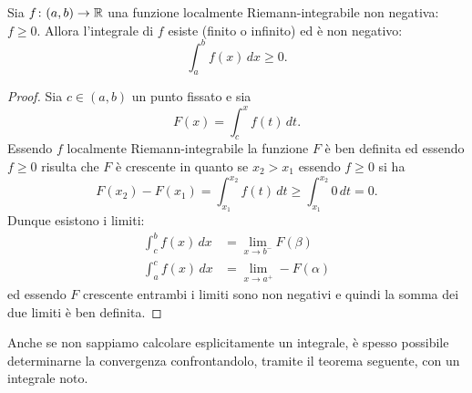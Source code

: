 \begin{theorem}
\label{th:integrabilita_positive}
\mymark{**}
Sia $f\colon (a,b)\to \mathbb R$ una funzione localmente Riemann-integrabile
non negativa: $f\ge 0$. Allora l'integrale di $f$ esiste (finito o infinito)
ed è non negativo:
\[
  \int_a^b f(x)\, dx \ge 0.
\]
\end{theorem}
%
\begin{proof}
\mymark{**}
Sia $c\in (a,b)$ un punto fissato e sia
\[
  F(x) = \int_c^x f(t)\, dt.
\]
Essendo $f$ localmente Riemann-integrabile la funzione $F$ è ben definita
ed essendo $f\ge 0$ risulta che $F$ è crescente in quanto se $x_2>x_1$
essendo $f\ge 0$ si ha
\[
  F(x_2)-F(x_1) = \int_{x_1}^{x_2} f(t)\, dt \ge \int_{x_1}^{x_2} 0\, dt = 0.
\]
Dunque esistono i limiti:
\begin{align*}
  \int_c^b f(x)\, dx  &= \lim_{x\to b^-} F(\beta)\\
  \int_a^c f(x)\, dx  &= \lim_{x\to a^+} -F(\alpha)
\end{align*}
ed essendo $F$ crescente entrambi i limiti sono non negativi e quindi
la somma dei due limiti è ben definita.
\end{proof}

Anche se non sappiamo calcolare esplicitamente un integrale,
è spesso possibile determinarne la convergenza confrontandolo,
tramite il teorema seguente, con un integrale noto.

